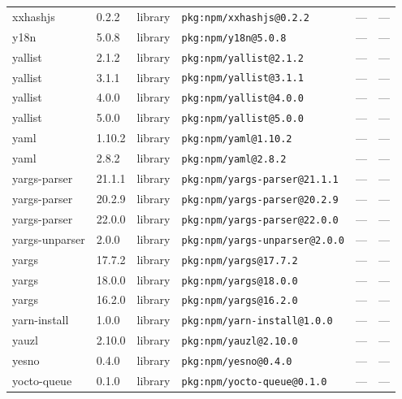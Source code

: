 \documentclass[11pt,a4paper]{article}
\begin{document}
\begin{longtable}{|p{4cm}|p{2cm}|p{1.6cm}|p{5cm}|p{1.5cm}|p{3.5cm}|}
\raggedright xxhashjs & 0.2.2 & library & \small\texttt{pkg:npm/xxhashjs@0.2.2} & — & \small — \\
\raggedright y18n & 5.0.8 & library & \small\texttt{pkg:npm/y18n@5.0.8} & — & \small — \\
\raggedright yallist & 2.1.2 & library & \small\texttt{pkg:npm/yallist@2.1.2} & — & \small — \\
\raggedright yallist & 3.1.1 & library & \small\texttt{pkg:npm/yallist@3.1.1} & — & \small — \\
\raggedright yallist & 4.0.0 & library & \small\texttt{pkg:npm/yallist@4.0.0} & — & \small — \\
\raggedright yallist & 5.0.0 & library & \small\texttt{pkg:npm/yallist@5.0.0} & — & \small — \\
\raggedright yaml & 1.10.2 & library & \small\texttt{pkg:npm/yaml@1.10.2} & — & \small — \\
\raggedright yaml & 2.8.2 & library & \small\texttt{pkg:npm/yaml@2.8.2} & — & \small — \\
\raggedright yargs-parser & 21.1.1 & library & \small\texttt{pkg:npm/yargs-parser@21.1.1} & — & \small — \\
\raggedright yargs-parser & 20.2.9 & library & \small\texttt{pkg:npm/yargs-parser@20.2.9} & — & \small — \\
\raggedright yargs-parser & 22.0.0 & library & \small\texttt{pkg:npm/yargs-parser@22.0.0} & — & \small — \\
\raggedright yargs-unparser & 2.0.0 & library & \small\texttt{pkg:npm/yargs-unparser@2.0.0} & — & \small — \\
\raggedright yargs & 17.7.2 & library & \small\texttt{pkg:npm/yargs@17.7.2} & — & \small — \\
\raggedright yargs & 18.0.0 & library & \small\texttt{pkg:npm/yargs@18.0.0} & — & \small — \\
\raggedright yargs & 16.2.0 & library & \small\texttt{pkg:npm/yargs@16.2.0} & — & \small — \\
\raggedright yarn-install & 1.0.0 & library & \small\texttt{pkg:npm/yarn-install@1.0.0} & — & \small — \\
\raggedright yauzl & 2.10.0 & library & \small\texttt{pkg:npm/yauzl@2.10.0} & — & \small — \\
\raggedright yesno & 0.4.0 & library & \small\texttt{pkg:npm/yesno@0.4.0} & — & \small — \\
\raggedright yocto-queue & 0.1.0 & library & \small\texttt{pkg:npm/yocto-queue@0.1.0} & — & \small — \\

\end{longtable}
\end{document}
